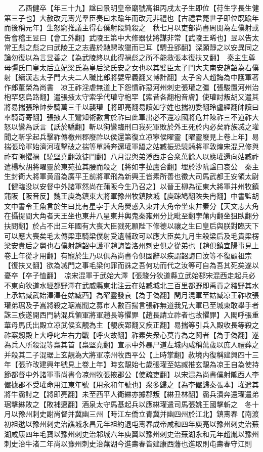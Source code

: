 　　乙酉健卒【年三十九】諡曰景明皇帝廟號高祖丙戌太子生即位【苻生字長生健第三子也】大赦改元夀光羣臣奏曰未踰年而改元非禮也【古禮君薨世子即位既踰年而後稱元年】生怒窮推議主得右僕射段純殺之　秋七月以吏部尚書周閔為左僕射或告會稽王昱曰【會工外翻】武陵王第中大修器仗將謀非常【武陵王晞也】昱以告太常王彪之彪之曰武陵王之志盡於馳騁畋獵而已耳【騁丑郢翻】深願靜之以安異同之論勿復以為言昱善之【為武陵終以此得禍彪之所不能救張本復扶又翻】　秦主生尊母彊氏曰皇太后立妃梁氏為皇后梁氏安之女也以其嬖臣太子門大夫南安趙韶為右僕射【續漢志太子門大夫二人職比郎將嬖卑義翻又博計翻】太子舍人趙誨為中護軍著作郎董榮為尚書　凉王祚淫虐無道上下怨憤祚惡河州刺史張瓘之彊【張駿置河州治枹罕惡烏路翻】遣張掖太守索孚代瓘守枹罕【索昔各翻枹音膚】使瓘討叛胡又遣其將易揣張玲帥步騎萬三千以襲瓘【將即亮翻易讀如字姓也揣初委翻玲盧經翻帥讀曰率騎奇寄翻】張掖人王鸞知術數言於祚曰此軍出必不還凉國將危并陳祚三不道祚大怒以鸞為訞言【訞於驕翻】斬以狥鸞臨刑曰我死軍敗於外王死於内必矣祚族㓕之瓘聞之斬孚起兵擊祚傳檄州郡廢祚以侯還第復立凉寧侯曜靈【曜靈廢見上卷上年】易揣張玲軍始濟河瓘擊破之揣等單騎奔還瓘軍躡之姑臧振恐驍騎將軍敦煌宋混兄修與祚有隙懼禍【驍堅堯翻敦徒門翻】八月混與弟澄西走合衆萬餘人以應瓘還向姑臧祚遣楊秋胡將曜靈於東苑拉其腰而殺之【將如字拉盧合翻】埋於沙阬諡曰哀公　秦主生封衛大將軍黄眉為廣平王前將軍飛為新興王皆素所善也徵大司馬武都王安領太尉【健臨没以安督中外諸軍然尚在蒲阪今生乃召之】以晉王柳為征東大將軍并州牧鎮蒲阪【阪音反】魏王庾為鎮東大將軍豫州牧鎮陜城【庾踈鳩翻陜失冉翻】中書監胡文中書令王魚言於生曰比有星孛于大角熒惑入東井大角帝坐東井秦分【天文志大角在攝提間大角者天王坐也東井八星東井輿鬼秦雍州分比毗至翻孛蒲内翻坐狙臥翻分扶問翻】於占不出三年國有大喪大臣戮死願陛下修德以禳之生曰皇后與朕對臨天下可以應大喪矣毛太傳梁車騎梁僕射受遺輔政可以應大臣矣九月生殺梁后及毛貴梁楞梁安貴后之舅也右僕射趙韶中護軍趙誨皆洛州刺史俱之從弟也【趙俱鎮宜陽事見上卷上年從才用翻】有寵於生乃以俱為尚書令俱固辭以疾謂韶誨曰汝等不復顧祖宗【復扶又翻】欲為㓕門之事毛梁何罪而誅之吾何功而代之汝等可自為吾其死矣遂以憂卒【卒子恤翻】　凉宋混軍于武始大澤【張駿分狄道縣立武始郡宋混西走起兵必不東向狄道水經都野澤在武威縣東北注云在姑臧城北三百里都野即禹貢之豬野其水上承姑臧武始澤澤在姑臧西】為曜靈發哀【為于偽翻】閏月混軍至姑臧凉王祚收張瓘弟琚及子嵩將殺之琚嵩聞之募市人數百揚言張祚無道我兄大軍已至城東敢舉手者誅三族遂開西門納混兵領軍將軍趙長等懼罪【趙長請立祚者也故懼罪】入閣呼張重華母馬氏出殿立凉武侯玄靚為主【靚疾郢翻又疾正翻】易揣等引兵入殿收長等殺之祚案劔殿上大呼叱左右力戰【呼火故翻】祚素失衆心莫肯為之鬭者【為于偽翻】遂為兵人所殺混等梟其首【梟堅堯翻】宣示中外暴尸道左城内咸稱萬歲以庶人禮葬之并殺其二子混琚上玄靚為大將軍凉州牧西平公【上時掌翻】赦境内復稱建興四十三年【張祚改建興年號見上卷上年】時玄靚始七歲張瓘至姑臧推玄靚為凉王自為使持節都督中外諸軍事尚書令凉州牧張掖郡公【使疏吏翻】以宋混為尚書僕射隴西人李儼據郡不受瓘命用江東年號【用永和年號也】衆多歸之【為李儼歸秦張本】瓘遣其將牛霸討之【將即亮翻】未至西平人衛綝亦據郡叛【綝丑林翻】霸兵潰奔還瓘遣弟琚擊綝敗之【敗補邁翻】酒泉太守馬基起兵以應綝瓘遣司馬張姚王國擊斬之　冬十月以豫州刺史謝尚督并冀幽三州【時江左僑立青冀并幽四州於江北】鎮夀春【南渡初祖逖以豫州刺史治譙城永昌元年祖約退屯夀春成帝咸和四年庾亮以豫州刺史治蕪湖咸康四年毛寶以豫州刺史治邾城六年庾翼以豫州刺史治蕪湖永和元年趙胤以豫州刺史治牛渚二年尚以豫州刺史治蕪湖今進夀春皆建康西藩也進取則屯夀春守江則